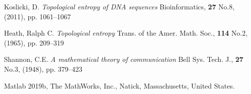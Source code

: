 \documentclass{article}
\begin{document}
\pagebreak


\begin{thebibliography}{99}

Koslicki, D.
\textit{Topological entropy of DNA sequences}
Bioinformatics, \textbf{27} No.8, (2011), pp. 1061–1067

Heath, Ralph C. 
\textit{Topological entropy}
Trans. of the Amer. Math. Soc., \textbf{114} No.2, (1965), pp. 209–319

Shannon, C.E.
\textit{A mathematical theory of communication}
Bell Sys. Tech. J., \textbf{27} No.3, (1948), pp. 379–423

Matlab 2019b, The MathWorks, Inc., Natick, Massachusetts, United States.

\end{thebibliography}
\end{document}
